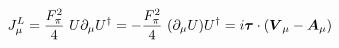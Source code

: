 \begin{equation}
J_\mu^L=\frac{F_\pi^2}{4}~U\partial_\mu U^\dag = -\frac{F_\pi^2}{4} ~(\partial_\mu U)U^\dag = 
i\mbox{\boldmath$\tau$}\cdot ( \mbox{\boldmath$V$}_\mu -\mbox{\boldmath$A$}_\mu )
\end{equation}

